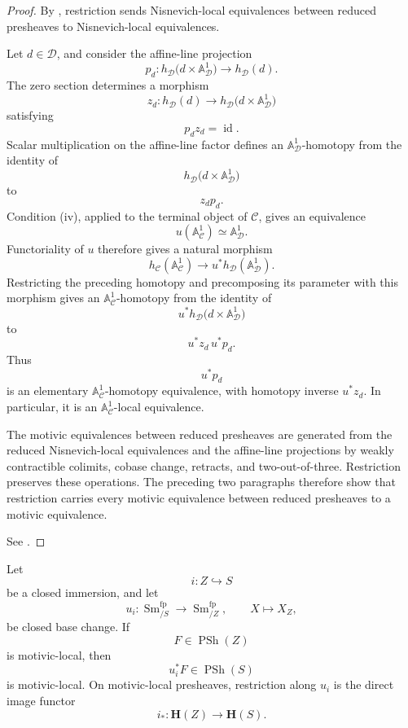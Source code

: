 \begin{proof}
By
,
restriction sends Nisnevich-local equivalences between reduced
presheaves to Nisnevich-local equivalences.

Let \(d\in\mathcal D\), and consider the affine-line projection
\[
    p_d
    \colon
    h_{\mathcal D}
    \bigl(
        d\times\mathbb A^1_{\mathcal D}
    \bigr)
    \longrightarrow
    h_{\mathcal D}(d).
\]
The zero section determines a morphism
\[
    z_d
    \colon
    h_{\mathcal D}(d)
    \longrightarrow
    h_{\mathcal D}
    \bigl(
        d\times\mathbb A^1_{\mathcal D}
    \bigr)
\]
satisfying
\[
    p_dz_d
    =
    \operatorname{id}.
\]
Scalar multiplication on the affine-line factor defines an
\(\mathbb A^1_{\mathcal D}\)-homotopy from the identity of
\[
    h_{\mathcal D}
    \bigl(
        d\times\mathbb A^1_{\mathcal D}
    \bigr)
\]
to
\[
    z_dp_d.
\]
Condition (iv), applied to the terminal object of \(\mathcal C\),
gives an equivalence
\[
    u(\mathbb A^1_{\mathcal C})
    \simeq
    \mathbb A^1_{\mathcal D}.
\]
Functoriality of \(u\) therefore gives a natural morphism
\[
    h_{\mathcal C}(\mathbb A^1_{\mathcal C})
    \longrightarrow
    u^*h_{\mathcal D}(\mathbb A^1_{\mathcal D}).
\]
Restricting the preceding homotopy and precomposing its parameter with
this morphism gives an \(\mathbb A^1_{\mathcal C}\)-homotopy from the
identity of
\[
    u^*h_{\mathcal D}
    \bigl(
        d\times\mathbb A^1_{\mathcal D}
    \bigr)
\]
to
\[
    u^*z_d\,u^*p_d.
\]
Thus
\[
    u^*p_d
\]
is an elementary \(\mathbb A^1_{\mathcal C}\)-homotopy equivalence,
with homotopy inverse \(u^*z_d\).  In particular, it is an
\(\mathbb A^1_{\mathcal C}\)-local equivalence.

The motivic equivalences between reduced presheaves are generated from
the reduced Nisnevich-local equivalences and the affine-line
projections by weakly contractible colimits, cobase change, retracts,
and two-out-of-three.  Restriction preserves these operations.  The
preceding two paragraphs therefore show that restriction carries every
motivic equivalence between reduced presheaves to a motivic
equivalence.

See
\cite{KhanBraveNewMotivicI}.
\end{proof}

\begin{lemma}
\label{lem:closed-restriction-preserves-motivic-local-objects}
Let
\[
    i
    \colon
    Z
    \hookrightarrow
    S
\]
be a closed immersion, and let
\[
    u_i
    \colon
    \operatorname{Sm}^{\mathrm{fp}}_{/S}
    \longrightarrow
    \operatorname{Sm}^{\mathrm{fp}}_{/Z},
    \qquad
    X
    \longmapsto
    X_Z,
\]
be closed base change.  If
\[
    F
    \in
    \operatorname{PSh}(Z)
\]
is motivic-local, then
\[
    u_i^*F
    \in
    \operatorname{PSh}(S)
\]
is motivic-local.  On motivic-local presheaves, restriction along
\(u_i\) is the direct image functor
\[
    i_*
    \colon
    \mathbf H(Z)
    \longrightarrow
    \mathbf H(S).
\]
\end{lemma}

